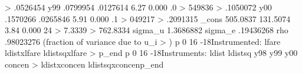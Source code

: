 >           .0526454
         y99 {\VBAR}   .0799954   .0127614     6.27   0.000     .0
> 549836                                                    
>           .1050072
         y00 {\VBAR}   .1570266   .0265846     5.91   0.000     .1
> 049217                                                    
>           .2091315
       _cons {\VBAR}   505.0837   131.5074     3.84   0.000     24
> 7.3339                                                    
>           762.8334
     sigma_u {\VBAR}  1.3686882
     sigma_e {\VBAR}  .19436268
         rho {\VBAR}  .98023276   (fraction of variance due to u_i
> )
{\lbr}p 0 16 -18{\rbr}Instrumented:   lfare ldistxlfare ldistsqxlfare{\lbr}
> p_end{\rbr}
{\lbr}p 0 16 -18{\rbr}Instruments:    ldist ldistsq y98 y99 y00 concen
>  ldistxconcen ldistsqxconcen{\lbr}p_end{\rbr}
{\smallskip}
